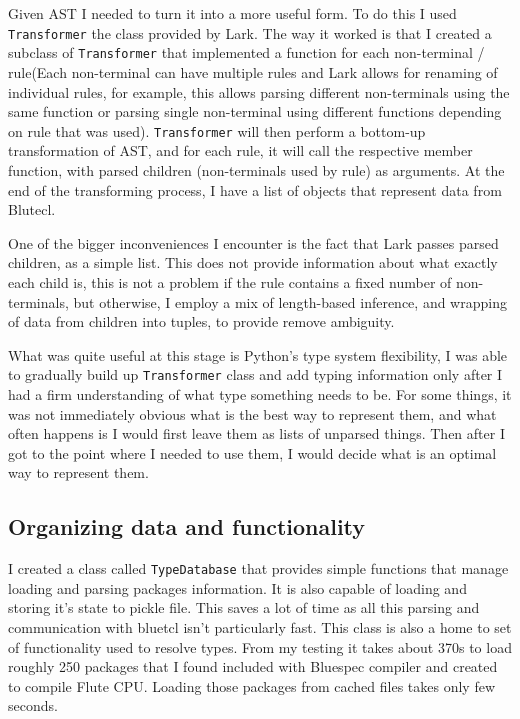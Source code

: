 \documentclass[12pt]{report}
\begin{document}
Given AST I needed to turn it into a more useful form. To do this I used \verb!Transformer! the class provided by Lark. The way it worked is that I created a subclass of \verb!Transformer! that implemented a function for each non-terminal / rule(Each non-terminal can have multiple rules and Lark allows for renaming of individual rules, for example, this allows parsing different non-terminals using the same function or parsing single non-terminal using different functions depending on rule that was used). \verb!Transformer! will then perform a bottom-up transformation of AST, and for each rule, it will call the respective member function, with parsed children (non-terminals used by rule) as arguments. At the end of the transforming process, I have a list of objects that represent data from Blutecl.  
\par
One of the bigger inconveniences I encounter is the fact that Lark passes parsed children, as a simple list. This does not provide information about what exactly each child is, this is not a problem if the rule contains a fixed number of non-terminals, but otherwise, I employ a mix of length-based inference, and wrapping of data from children into tuples, to provide remove ambiguity.  
\par
What was quite useful at this stage is Python's type system flexibility, I was able to gradually build up \verb!Transformer! class and add typing information only after I had a firm understanding of what type something needs to be. For some things, it was not immediately obvious what is the best way to represent them, and what often happens is I would first leave them as lists of unparsed things. Then after I got to the point where I needed to use them, I would decide what is an optimal way to represent them. 

\subsection{Organizing data and functionality}
I created a class called \verb!TypeDatabase! that provides simple functions that manage loading and parsing packages information. It is also capable of loading and storing it's state to pickle file. This saves a lot of time as all this parsing and communication with bluetcl isn't particularly fast. This class is also a home to set of functionality used to resolve types. From my testing it takes about 370s to load roughly 250 packages that I found included with Bluespec compiler and created to compile Flute CPU. Loading those packages from cached files takes only few seconds.
\end{document}
